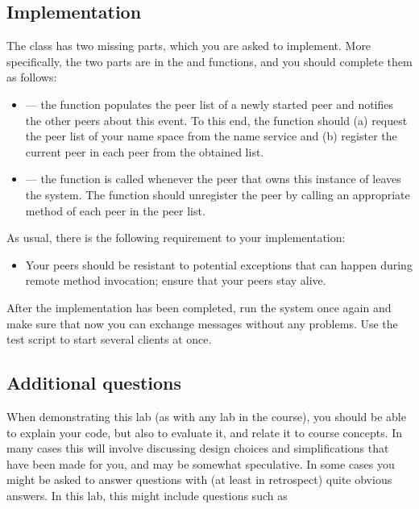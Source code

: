 \documentclass[a4paper]{article}
\begin{document}
\subsection{Implementation}
The  class has two missing parts, which you are asked to
implement. More specifically, the two parts are in the  and
 functions, and you should complete them as follows:
\begin{itemize}

  \item {} --- the function populates the peer list of a newly
  started peer and notifies the other peers about this event. To this end, the
  function should (a) request the peer list of your name space from the name
  service and (b) register the current peer in each peer from the obtained list.

  \item {} --- the function is called whenever the peer that owns
  this instance of  leaves the system. The function should
  unregister the peer by calling an appropriate method of each peer in the peer
  list.

\end{itemize}
As usual, there is the following requirement to your implementation:
\begin{itemize}

  \item Your peers should be resistant to potential exceptions that can happen
  during remote method invocation; ensure that your peers stay alive.

\end{itemize}
After the implementation has been completed, run the system once again and make
sure that now you can exchange messages without any problems. Use the test
script to start several clients at once.

\subsection{Additional questions}
When demonstrating this lab (as with any lab in the course), you
should be able to explain your code, but also to evaluate it, and
relate it to course concepts. In many cases this will involve
discussing design choices and simplifications that have been made for
you, and may be somewhat speculative. In some cases you might be asked
to answer questions with (at least in retrospect) quite obvious
answers. In this lab, this might include questions such as
\end{document}
